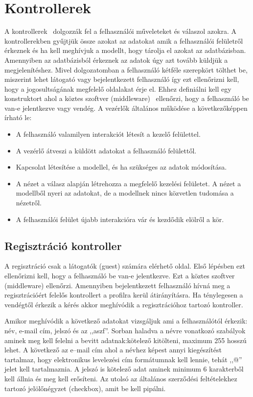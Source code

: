 \documentclass[
]{thesis-ekf}
\theoremstyle{definition}
\theoremstyle{remark}
\begin{document}
\section{Kontrollerek}
A kontrollerek~\cite{laravel_controller} dolgozzák fel a felhasználói műveleteket és válaszol azokra. A kontrollerekben gyűjtjük össze azokat az adatokat amik a felhasználói felületről érkeznek és ha kell meghívjuk a modellt, hogy tárolja el azokat az adatbázisban. Amennyiben az adatbázisból érkeznek az adatok úgy azt tovább küldjük a megjelenítéshez. Mivel dolgozatomban a felhasználó kétféle szerepkört tölthet be, miszerint lehet látogató vagy bejelentkezett felhasználó így ezt ellenőrizni kell, hogy a jogosultságának megfelelő oldalakat érje el. Ehhez definiálni kell egy konstruktort ahol a köztes szoftver (middleware)~\cite{laravel_middlewear} ellenőrzi, hogy a felhasználó be van-e jelentkezve vagy vendég.
A vezérlők általános működése a következőképpen írható le:~\cite{controller_cicle}
\begin{itemize}
\item{A felhasználó valamilyen interakciót létesít a kezelő felülettel.}
\item{A vezérlő átveszi a küldött adatokat a felhasználó felülettől.}
\item{Kapcsolat létesítése a modellel, és ha szükséges az adatok módosítása.}
\item{ A nézet a válasz alapján létrehozza a megfelelő kezelési felületet. A nézet a modellből nyeri az adatokat, de a modellnek nincs közvetlen tudomása a nézetről.}
\item{A felhasználói felület újabb interakcióra vár és kezdődik elölről a kör.}
\end{itemize}
\subsection{Regisztráció kontroller}
A regisztráció csak a látogatók (guest) számára elérhető oldal. Első lépésben ezt ellenőrizni kell, hogy a felhasználó be van-e jelentkezve. Ezt a köztes szoftver (middleware) ellenőrzi. Amennyiben bejelentkezett felhasználó hívná meg a regisztrációért felelős kontrollert a profilra kerül átirányításra. Ha ténylegesen a vendégtől érkezik a kérés akkor meghívódik a regisztrációhoz tartozó kontroller.  

Amikor meghívódik a következő adatokat vizsgáljuk ami a felhasználótól érkezik: név, e-mail cím, jelszó és az ,,aszf''.
Sorban haladva a névre vonatkozó szabályok aminek meg kell felelni a bevitt adatnak:kötelező kitölteni, maximum 255 hosszú lehet. A következő az e--mail cím ahol a névhez képest annyi kiegészítést tartalmaz, hogy elektronikus levelezési cím formátumnak kell lennie, tehát ,,@'' jelet kell tartalmaznia.
A jelszó is kötelező adat aminek minimum 6 karakterből kell állnia és meg kell erősíteni. Az utolsó az általános szerződési feltételekhez tartozó jelölőnégyzet (checkbox), amit be kell pipálni.
\end{document}
